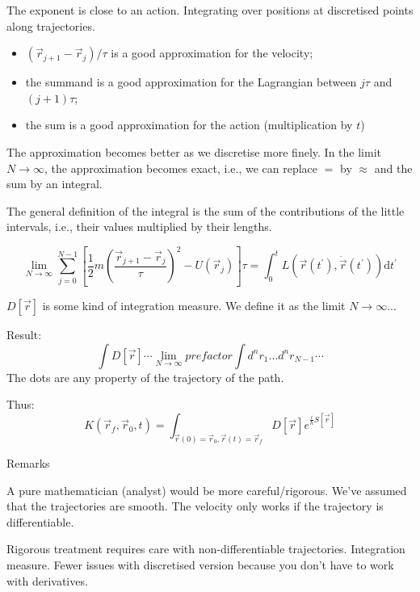 \documentclass[a4paper]{extarticle}
\newcommand{\tpr}{t^\prime}
\newcommand{\dtpr}{\text{d}t^\prime}
\newcommand{\ihbar}{\frac{i}{\hbar}}
\newcommand{\propagator}{K(\vec{r}_f, \vec{r}_0, t)}
\begin{document}
The exponent is close to an action.
Integrating over positions at discretised points along trajectories.

\begin{itemize}
  \item $(\vec{r}_{j + 1} - \vec{r}_j)/\tau$ is a good approximation for the velocity;
  \item the summand is a good approximation for the Lagrangian between $j\tau$ and $(j + 1)\tau$;
  \item the sum is a good approximation for the action (multiplication by $t$)
\end{itemize}

The approximation becomes better as we discretise more finely.
In the limit $N \to \infty$, the approximation becomes exact, i.e., we can
replace $=$ by $\approx$ and the sum by an integral.

The general definition of the integral is the sum of the contributions of
the little intervals, i.e., their values multiplied by their lengths.

\begin{equation}
  \lim_{N \to \infty} \sum_{j = 0}^{N - 1} \left[
    \frac{1}{2}m\left( \frac{\vec{r}_{j + 1} - \vec{r}_{j}}{\tau} \right)^2 -
    U(\vec{r}_j)
    \right] \tau
  = \int_0^t L(\vec{r}(\tpr), \dot{\vec{r}}(\tpr)) \dtpr
\end{equation}

$D\left[\vec{r}\right]$ is some kind of integration measure.
We define it as the limit $N \to \infty$...

Result:
\begin{equation}
  \int D\left[\vec{r}\right] \cdots
  \lim_{N \to \infty} prefactor \int d^n r_1 \dots d^n r_{N - 1} \cdots
\end{equation}
The dots are any property of the trajectory of the path.

Thus:
\begin{equation}
  \propagator = \int_{\vec{r}(0) = \vec{r}_0, \vec{r}(t) = \vec{r}_f}
  D\left[\vec{r}\right] e^{\ihbar S\left[\vec{r}\right]}
\end{equation}

Remarks

A pure mathematician (analyst) would be more careful/rigorous.
We've assumed that the trajectories are smooth.
The velocity only works if the trajectory is differentiable.

Rigorous treatment requires care with non-differentiable trajectories.
Integration measure.
Fewer issues with discretised version because you don't have to work with
derivatives.
\end{document}
